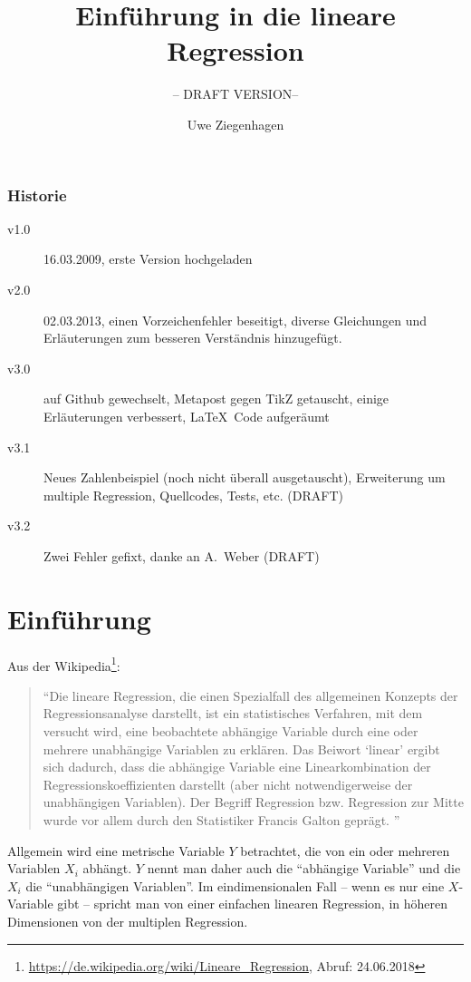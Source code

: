 \documentclass[ngerman, 12pt]{scrartcl}
\title{Einführung in die lineare Regression}
\subtitle{-- DRAFT VERSION--}
\author{Uwe Ziegenhagen}
\begin{document}
\maketitle

\subsubsection*{Historie}

\begin{description}
\item[v1.0] 16.03.2009, erste Version hochgeladen
\item[v2.0] 02.03.2013, einen Vorzeichenfehler beseitigt, diverse Gleichungen und Erläuterungen zum besseren Verständnis hinzugefügt.
\item [v3.0] auf Github gewechselt, Metapost gegen TikZ getauscht, einige Erläuterungen verbessert, \LaTeX\ Code aufgeräumt
\item [v3.1] Neues Zahlenbeispiel (noch nicht überall ausgetauscht), Erweiterung um multiple Regression, Quellcodes, Tests, etc. (DRAFT) 
\item [v3.2] Zwei Fehler gefixt, danke an A.~Weber (DRAFT) 
\end{description}

\section{Einführung}

Aus der Wikipedia\footnote{\url{https://de.wikipedia.org/wiki/Lineare_Regression}, Abruf: 24.06.2018}: 

\begin{quote}
\enquote{Die lineare Regression, die einen Spezialfall des allgemeinen Konzepts der Regressionsanalyse darstellt, ist ein statistisches Verfahren, mit dem versucht wird, eine beobachtete abhängige Variable durch eine oder mehrere unabhängige Variablen zu erklären. Das Beiwort \enquote{linear} ergibt sich dadurch, dass die abhängige Variable eine Linearkombination der Regressionskoeffizienten darstellt (aber nicht notwendigerweise der unabhängigen Variablen). Der Begriff Regression bzw. Regression zur Mitte wurde vor allem durch den Statistiker Francis Galton geprägt. 
}\end{quote}

Allgemein wird eine metrische Variable $Y$ betrachtet, die von ein oder mehreren Variablen $X_i$ abhängt. $Y$ nennt man daher auch die \enquote{abhängige Variable} und die $X_i$ die \enquote{unabhängigen Variablen}.  Im eindimensionalen Fall -- wenn es nur eine $X$-Variable gibt -- spricht man von einer einfachen linearen Regression, in höheren Dimensionen von der multiplen Regression.
\end{document}
